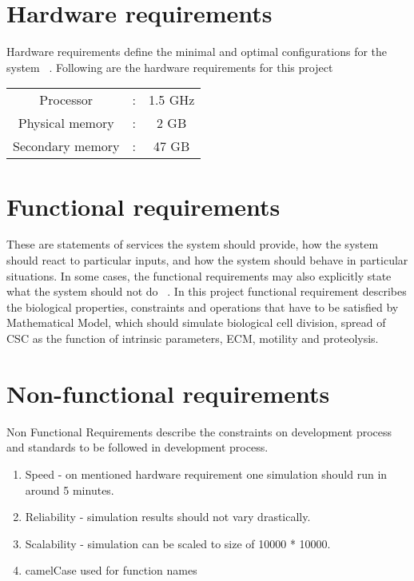 \section{Hardware requirements}
Hardware requirements define the minimal and optimal configurations for the system ~\cite{SoftwareEngineering}. 
Following are the hardware requirements for this project
\begin{table}[H]
	\begin{center}
		\begin{tabular}{ c  c  c  }
			  Processor	 & : &	1.5 GHz	\\
			  Physical memory 		 & : &      2 GB\\
			  Secondary memory	 & : &	47 GB	\\
		\end{tabular}
	\end{center}
\end{table}


\section{Functional requirements}
These are statements of services the system should provide, 
how the system should react to particular inputs, and how the system should behave in particular situations.
In some cases, the functional requirements may also explicitly state what the system should not do ~\cite{SoftwareEngineering}. 
In this project functional requirement describes the biological properties, constraints and operations that have to be satisfied by Mathematical Model, 
which should simulate biological cell division, spread of CSC as the function of intrinsic parameters, ECM, motility and proteolysis.
  
\section{Non-functional requirements}
Non Functional Requirements describe the constraints on development process and standards to be followed in development process.
 \begin{enumerate}
  \item Speed - on mentioned hardware requirement one simulation should run in around 5 minutes.
  \item Reliability - simulation results should not vary drastically.
  \item Scalability - simulation can be scaled to size of 10000 * 10000.
  \item camelCase used for function names
 \end{enumerate}  
 
